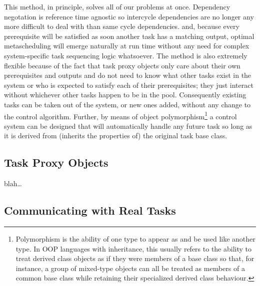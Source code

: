 \documentclass[11pt,a4paper]{article}
\begin{document}
This method, in principle, solves all of our problems at once.
Dependency negotation is reference time agnostic so intercycle
dependencies are no longer any more difficult to deal with than same
cycle dependencies.  and, because every prerequisite will be satisfied
as soon another task has a matching output, optimal metascheduling will
emerge naturally at run time without any need for complex
system-specific task sequencing logic whatsoever.  The method is also
extremely flexible because of the fact that task proxy objects only care
about their own prerequisites and outputs and do not need to know what
other tasks exist in the system or who is expected to satisfy each of
their prerequisites; they just interact without whichever other tasks
happen to be in the pool.  Consequently existing tasks can be taken out
of the system, or new ones added, without any change to the control
algorithm.  Further, by means of object
polymorphism\footnote{Polymorphism is the ability of one type to appear
as and be used like another type. In OOP languages with inheritance,
this usually refers to the ability to treat derived class objects as if
they were members of a base class so that, for instance, a group of
mixed-type objects can all be treated as members of a common base class
while retaining their specialized derived class behaviour.} a control
system can be designed that will automatically handle any future task so
long as it is derived from (inherits the properties of) the original
task base class.

\subsection{Task Proxy Objects}

blah\dots

\label{sec-task-messaging}
\subsection{Communicating with Real Tasks}
\end{document}
